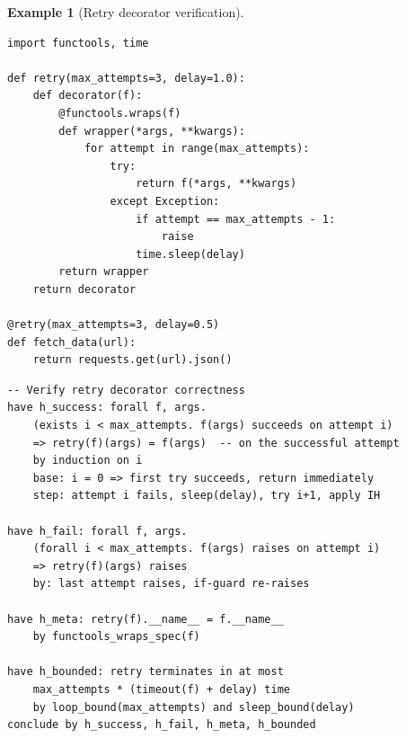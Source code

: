 \documentclass[11pt,a4paper]{report}
\theoremstyle{definition}
\newtheorem{example}[definition]{Example}
\theoremstyle{plain}
\begin{document}
\begin{example}[Retry decorator verification]
\begin{lstlisting}[style=python]
import functools, time

def retry(max_attempts=3, delay=1.0):
    def decorator(f):
        @functools.wraps(f)
        def wrapper(*args, **kwargs):
            for attempt in range(max_attempts):
                try:
                    return f(*args, **kwargs)
                except Exception:
                    if attempt == max_attempts - 1:
                        raise
                    time.sleep(delay)
        return wrapper
    return decorator

@retry(max_attempts=3, delay=0.5)
def fetch_data(url):
    return requests.get(url).json()
\end{lstlisting}

\begin{lstlisting}[style=proof]
-- Verify retry decorator correctness
have h_success: forall f, args.
    (exists i < max_attempts. f(args) succeeds on attempt i)
    => retry(f)(args) = f(args)  -- on the successful attempt
    by induction on i
    base: i = 0 => first try succeeds, return immediately
    step: attempt i fails, sleep(delay), try i+1, apply IH

have h_fail: forall f, args.
    (forall i < max_attempts. f(args) raises on attempt i)
    => retry(f)(args) raises
    by: last attempt raises, if-guard re-raises

have h_meta: retry(f).__name__ = f.__name__
    by functools_wraps_spec(f)

have h_bounded: retry terminates in at most
    max_attempts * (timeout(f) + delay) time
    by loop_bound(max_attempts) and sleep_bound(delay)
conclude by h_success, h_fail, h_meta, h_bounded
\end{lstlisting}
\end{example}
\end{document}
